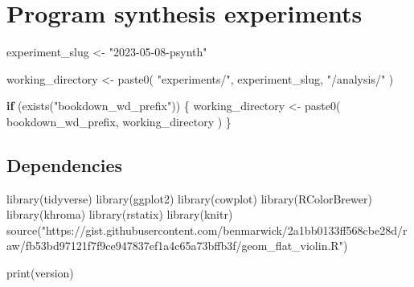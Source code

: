 \documentclass[
]{book}
\newenvironment{Shaded}{\begin{snugshade}}{\end{snugshade}}
\newcommand{\ControlFlowTok}[1]{\textcolor[rgb]{0.13,0.29,0.53}{\textbf{#1}}}
\newcommand{\FunctionTok}[1]{\textcolor[rgb]{0.00,0.00,0.00}{#1}}
\newcommand{\NormalTok}[1]{#1}
\newcommand{\OtherTok}[1]{\textcolor[rgb]{0.56,0.35,0.01}{#1}}
\newcommand{\StringTok}[1]{\textcolor[rgb]{0.31,0.60,0.02}{#1}}
\begin{document}
\hypertarget{program-synthesis-experiments}{%
\chapter{Program synthesis experiments}\label{program-synthesis-experiments}}

\begin{Shaded}
\begin{Highlighting}[]
\NormalTok{experiment\_slug }\OtherTok{\textless{}{-}} \StringTok{"2023{-}05{-}08{-}psynth"}

\NormalTok{working\_directory }\OtherTok{\textless{}{-}} \FunctionTok{paste0}\NormalTok{(}
  \StringTok{"experiments/"}\NormalTok{,}
\NormalTok{  experiment\_slug,}
  \StringTok{"/analysis/"}
\NormalTok{)}

\ControlFlowTok{if}\NormalTok{ (}\FunctionTok{exists}\NormalTok{(}\StringTok{"bookdown\_wd\_prefix"}\NormalTok{)) \{}
\NormalTok{  working\_directory }\OtherTok{\textless{}{-}} \FunctionTok{paste0}\NormalTok{(}
\NormalTok{    bookdown\_wd\_prefix,}
\NormalTok{    working\_directory}
\NormalTok{  )}
\NormalTok{\}}
\end{Highlighting}
\end{Shaded}

\hypertarget{dependencies-1}{%
\section{Dependencies}\label{dependencies-1}}

\begin{Shaded}
\begin{Highlighting}[]
\FunctionTok{library}\NormalTok{(tidyverse)}
\FunctionTok{library}\NormalTok{(ggplot2)}
\FunctionTok{library}\NormalTok{(cowplot)}
\FunctionTok{library}\NormalTok{(RColorBrewer)}
\FunctionTok{library}\NormalTok{(khroma)}
\FunctionTok{library}\NormalTok{(rstatix)}
\FunctionTok{library}\NormalTok{(knitr)}
\FunctionTok{source}\NormalTok{(}\StringTok{"https://gist.githubusercontent.com/benmarwick/2a1bb0133ff568cbe28d/raw/fb53bd97121f7f9ce947837ef1a4c65a73bffb3f/geom\_flat\_violin.R"}\NormalTok{)}
\end{Highlighting}
\end{Shaded}

\begin{Shaded}
\begin{Highlighting}[]
\FunctionTok{print}\NormalTok{(version)}
\end{Highlighting}
\end{Shaded}
\end{document}

